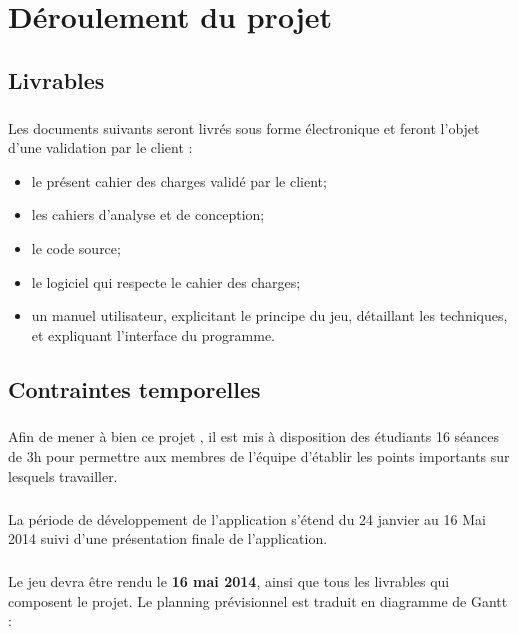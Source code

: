 \chapter{Déroulement du projet}


\section {Livrables}
        \paragraph*{}
        Les documents suivants seront livrés sous forme électronique et feront l'objet d'une validation par le client :
        \begin{itemize}
                \item le présent cahier des charges validé par le client;
                \item les cahiers d'analyse et de conception;
                \item le code source;
                \item le logiciel qui respecte le cahier des charges;
                \item un manuel utilisateur, explicitant le principe du jeu, détaillant les techniques, et expliquant l'interface du programme.
        \end{itemize}


\section{Contraintes temporelles}
        \paragraph*{}
        Afin de mener à bien ce projet , il est mis à disposition des étudiants 16 séances de 3h pour permettre aux membres de l'équipe d'établir les points importants sur lesquels travailler.
        \paragraph*{}
        La période de développement de l’application s’étend du 24 janvier au 16 Mai 2014 suivi d’une présentation finale de l’application. %
        \paragraph*{}
        Le jeu devra être rendu le \textbf{16 mai 2014}, ainsi que tous les livrables qui composent le projet.
        Le planning prévisionnel est traduit en diagramme de Gantt :\\

